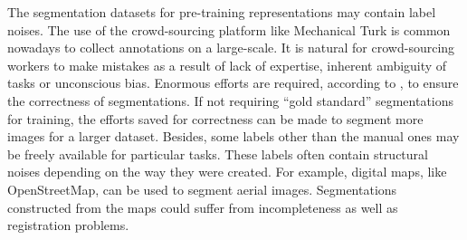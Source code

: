 The segmentation datasets for pre-training representations may contain label noises.
The use of the crowd-sourcing platform like Mechanical Turk is common nowadays to collect annotations on a large-scale.
It is natural for crowd-sourcing workers to make mistakes as a result of lack of expertise, inherent ambiguity of tasks or unconscious bias.
Enormous efforts are required, according to  \cite{lin2014microsoft,everingham2015pascal}, to ensure the correctness of segmentations.
If not requiring ``gold standard'' segmentations for training, the efforts saved for correctness can be made to segment more images for a larger dataset.
Besides,  some labels other than the manual ones may be freely available for particular tasks.
These labels often contain structural noises depending on the way they were created.
For example, digital maps, like OpenStreetMap, can be used to segment aerial images.
Segmentations constructed from the maps could suffer from incompleteness as well as registration problems. \cite{mnih2012learning}



